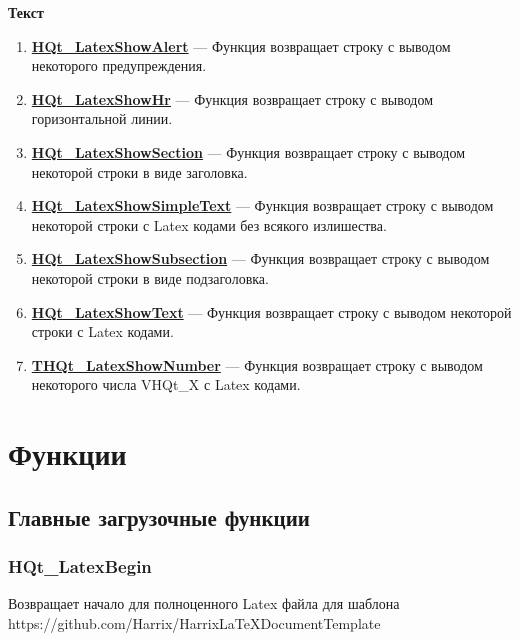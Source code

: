 \documentclass[a4paper,12pt]{article}
\begin{document}
\textbf{Текст}
\begin{enumerate}

\item \textbf{\hyperref[HQt_LatexShowAlert]{HQt\_LatexShowAlert}} --- Функция возвращает строку с выводом некоторого предупреждения.

\item \textbf{\hyperref[HQt_LatexShowHr]{HQt\_LatexShowHr}} --- Функция возвращает строку с выводом горизонтальной линии.

\item \textbf{\hyperref[HQt_LatexShowSection]{HQt\_LatexShowSection}} --- Функция возвращает строку с выводом некоторой строки в виде заголовка.

\item \textbf{\hyperref[HQt_LatexShowSimpleText]{HQt\_LatexShowSimpleText}} --- Функция возвращает строку с выводом некоторой строки с Latex кодами без всякого излишества.

\item \textbf{\hyperref[HQt_LatexShowSubsection]{HQt\_LatexShowSubsection}} --- Функция возвращает строку с выводом некоторой строки в виде подзаголовка.

\item \textbf{\hyperref[HQt_LatexShowText]{HQt\_LatexShowText}} --- Функция возвращает строку с выводом некоторой строки с Latex кодами.

\item \textbf{\hyperref[THQt_LatexShowNumber]{THQt\_LatexShowNumber}} --- Функция возвращает строку с выводом некоторого числа VHQt\_X с Latex кодами.

\end{enumerate}


\newpage
\section{Функции}
\subsection{Главные загрузочные функции}

\subsubsection{HQt\_LatexBegin}\label{HQt_LatexBegin}

Возвращает начало для полноценного Latex файла для шаблона https://github.com/Harrix/HarrixLaTeXDocumentTemplate
\end{document}

